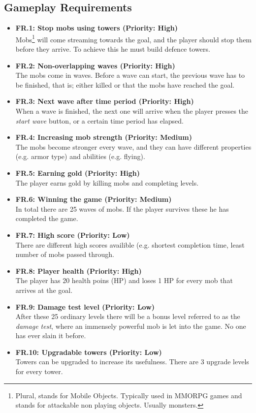 \documentclass[11pt,a4paper]{article}
\begin{document}
\subsection{Gameplay Requirements}
\begin{itemize}
\item \textbf{FR.1: Stop mobs using towers (Priority: High)}\\ Mobs\footnote{Plural, stands for Mobile Objects. Typically used in MMORPG games and stands for attackable non playing objects. Usually monsters.} will come streaming towards the goal, and the player should stop them before they arrive. To achieve this he must build defence towers. 
\item \textbf{FR.2: Non-overlapping waves (Priority: High)}\\ The mobs come in waves. Before a wave can start, the previous wave has to be finished, that is; either killed or that the mobs have reached the goal.
\item \textbf{FR.3: Next wave after time period (Priority: High)}\\ When a wave is finished, the next one will arrive when the player presses the \textit{start wave} button, or a certain time period has elapsed. 
\item \textbf{FR.4: Increasing mob strength (Priority: Medium)}\\ The mobs become stronger every wave, and they can have different properties (e.g. armor type) and abilities (e.g. flying).
\item \textbf{FR.5: Earning gold (Priority: High)}\\ The player earns gold by killing mobs and completing levels.
\item \textbf{FR.6: Winning the game (Priority: Medium)}\\ In total there are 25 waves of mobs. If the player survives these he has completed the game.
\item \textbf{FR.7: High score (Priority: Low)}\\ There are different high scores availible (e.g. shortest completion time, least number of mobs passed through.
\item \textbf{FR.8: Player health (Priority: High)}\\ The player has 20 health poins (HP) and loses 1 HP for every mob that arrives at the goal.
\item \textbf{FR.9: Damage test level (Priority: Low)}\\ After these 25 ordinary levels there will be a bonus level referred to as the \textit{damage test}, where an immensely powerful mob is let into the game. No one has ever slain it before.
\item \textbf{FR.10: Upgradable towers (Priority: Low)}\\ Towers can be upgraded to increase its usefulness. There are 3 upgrade levels for every tower.
\end{itemize}
\end{document}

